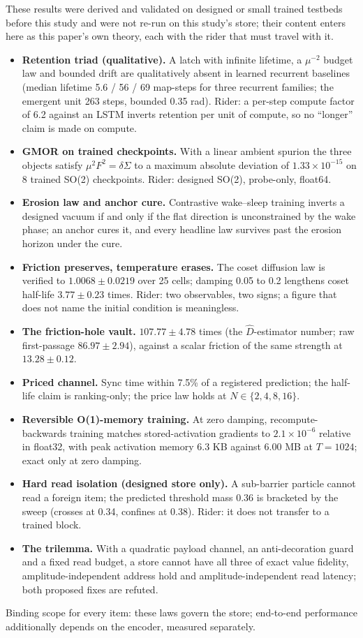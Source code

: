 \documentclass{article}
\newcommand{\sci}[2]{\ensuremath{#1\times10^{#2}}}
\begin{document}
These results were derived and validated on designed or small trained testbeds before this study
and were not re-run on this study's store; their content enters here as this paper's own theory,
each with the rider that must travel with it.
\begin{itemize}[leftmargin=*,itemsep=1pt]
\item \textbf{Retention triad (qualitative).} A latch with infinite lifetime, a $\mu^{-2}$ budget
  law and bounded drift are qualitatively absent in learned recurrent baselines (median lifetime 5.6
  / 56 / 69 map-steps for three recurrent families; the emergent unit 263 steps, bounded 0.35 rad).
  Rider: a per-step compute factor of 6.2 against an LSTM inverts retention per unit of compute, so
  no ``longer'' claim is made on compute.
\item \textbf{GMOR on trained checkpoints.} With a linear ambient spurion the three objects satisfy
  $\mu^2F^2=\delta\Sigma$ to a maximum absolute deviation of \sci{1.33}{-15} on 8 trained SO(2)
  checkpoints. Rider: designed SO(2), probe-only, float64.
\item \textbf{Erosion law and anchor cure.} Contrastive wake--sleep training inverts a designed
  vacuum if and only if the flat direction is unconstrained by the wake phase; an anchor cures it,
  and every headline law survives past the erosion horizon under the cure.
\item \textbf{Friction preserves, temperature erases.} The coset diffusion law is verified to
  $1.0068\pm0.0219$ over 25 cells; damping 0.05 to 0.2 lengthens coset half-life
  $3.77\pm0.23$ times. Rider: two observables, two signs; a figure that does not name the initial
  condition is meaningless.
\item \textbf{The friction-hole vault.} $107.77\pm4.78$ times (the $\hat D$-estimator number; raw
  first-passage $86.97\pm2.94$), against a scalar friction of the same strength at
  $13.28\pm0.12$.
\item \textbf{Priced channel.} Sync time within 7.5\% of a registered prediction; the half-life
  claim is ranking-only; the price law holds at $N\in\{2,4,8,16\}$.
\item \textbf{Reversible O(1)-memory training.} At zero damping, recompute-backwards training
  matches stored-activation gradients to \sci{2.1}{-6} relative in float32, with peak activation
  memory 6.3 KB against 6.00 MB at $T=1024$; exact only at zero damping.
\item \textbf{Hard read isolation (designed store only).} A sub-barrier particle cannot read a
  foreign item; the predicted threshold mass 0.36 is bracketed by the sweep (crosses at 0.34,
  confines at 0.38). Rider: it does not transfer to a trained block.
\item \textbf{The trilemma.} With a quadratic payload channel, an anti-decoration guard and a fixed
  read budget, a store cannot have all three of exact value fidelity, amplitude-independent address
  hold and amplitude-independent read latency; both proposed fixes are refuted.
\end{itemize}
Binding scope for every item: these laws govern the store; end-to-end performance additionally
depends on the encoder, measured separately.
\end{document}
